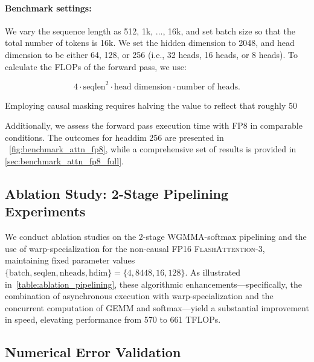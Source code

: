 \begin{itemize}
\paragraph{Benchmark settings:} We vary the sequence length as 512, 1k, ..., 16k, and set batch size so that the total number of tokens is 16k. We set the hidden dimension to 2048, and head dimension to be either 64, 128, or 256 (i.e., 32 heads, 16 heads, or 8 heads). To calculate the FLOPs of the forward pass, we use:

\begin{equation*}
  4 \cdot \text{seqlen}^2 \cdot \text{head dimension} \cdot \text{number of heads}.
\end{equation*}

Employing causal masking requires halving the value to reflect that roughly 50%

Additionally, we assess the forward pass execution time with FP8 in comparable conditions. The outcomes for headdim 256 are presented in ~\cref{fig:benchmark_attn_fp8}, while a comprehensive set of results is provided in \cref{sec:benchmark_attn_fp8_full}.

\subsection{Ablation Study: 2-Stage Pipelining Experiments}
\label{sec:2-stage-pipelining-experiments}

We conduct ablation studies on the 2-stage WGMMA-softmax pipelining and the use of warp-specialization for the non-causal FP16 \textsc{FlashAttention-3}, maintaining fixed parameter values $\{\text{batch}, \text{seqlen}, \text{nheads}, \text{hdim}\} = \{ 4, 8448, 16, 128\}$. As illustrated in~\cref{table:ablation_pipelining}, these algorithmic enhancements—specifically, the combination of asynchronous execution with warp-specialization and the concurrent computation of GEMM and softmax—yield a substantial improvement in speed, elevating performance from 570 to 661 TFLOPs.

\subsection{Numerical Error Validation}
\label{sec:numerical_error}


\end{itemize}
